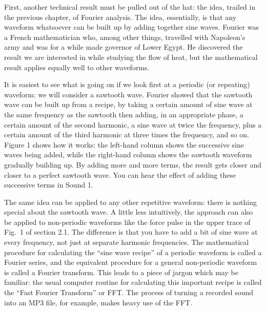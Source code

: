 

  First, another technical result must be pulled out of the hat: the idea, 
  trailed in the previous chapter, of Fourier analysis. The idea, essentially, 
  is that any waveform whatsoever can be built up by adding together sine 
  waves. Fourier was a French mathematician who, among other things, travelled 
  with Napoleon's army and was for a while made governor of Lower Egypt. He 
  discovered the result we are interested in while studying the flow of heat, 
  but the mathematical result applies equally well to other waveforms. 

  It is easiest to see what is going on if we look first at a periodic (or 
  repeating) waveform: we will consider a sawtooth wave. Fourier showed that 
  the sawtooth wave can be built up from a recipe, by taking a certain amount 
  of sine wave at the same frequency as the sawtooth then adding, in an 
  appropriate phase, a certain amount of the second harmonic, a sine wave at 
  twice the frequency, plus a certain amount of the third harmonic at three 
  times the frequency, and so on. Figure 1 shows how it works: the left-hand 
  column shows the successive sine waves being added, while the right-hand 
  column shows the sawtooth waveform gradually building up. By adding more and 
  more terms, the result gets closer and closer to a perfect sawtooth wave. You 
  can hear the effect of adding these successive terms in Sound 1. 


\audio{}

  The same idea can be applied to any other repetitive waveform: there is 
  nothing special about the sawtooth wave. A little less intuitively, the 
  approach can also be applied to non-periodic waveforms like the force pulse 
  in the upper trace of Fig.\ 1 of section 2.1. The difference is that you have 
  to add a bit of sine wave at every frequency, not just at separate harmonic 
  frequencies. The mathematical procedure for calculating the ``sine wave 
  recipe'' of a periodic waveform is called a Fourier series, and the 
  equivalent procedure for a general non-periodic waveform is called a Fourier 
  transform. This leads to a piece of jargon which may be familiar: the usual 
  computer routine for calculating this important recipe is called the ``Fast 
  Fourier Transform'' or FFT. The process of turning a recorded sound into an 
  MP3 file, for example, makes heavy use of the FFT. 

